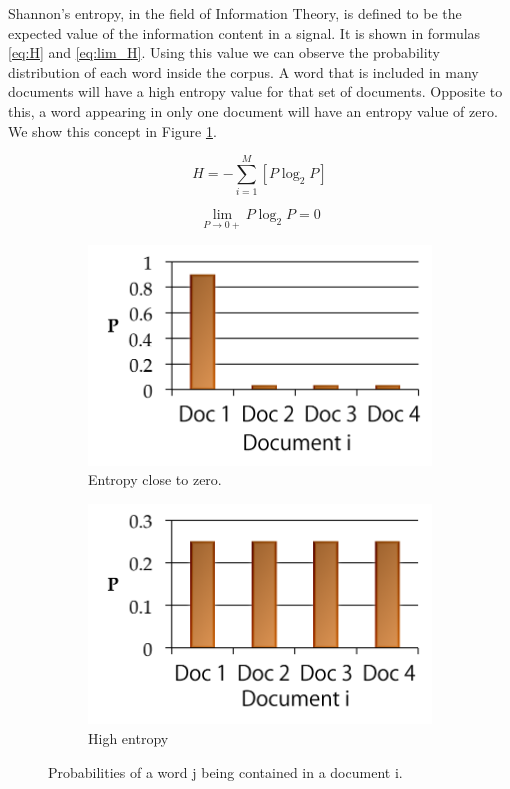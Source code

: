 \documentclass[review]{elsarticle}
\begin{document}
Shannon’s entropy, in the field of Information Theory, is defined to be the expected value of the information content in a signal. It is shown in formulas \ref{eq:H} and \ref{eq:lim_H}. Using this value we can observe the probability distribution of each word inside the corpus. A word that is included in many documents will have a high entropy value for that set of documents. Opposite to this, a word appearing in only one document will have an entropy value of zero. We show this concept in Figure \ref{fig:entropygraphs}.

\begin{equation}\label{eq:H}
H = - \sum_{i=1}^M [P \log_2 P]
\end{equation}

\begin{equation}\label{eq:lim_H}
\lim_{P\to0+} P \log_2 P = 0
\end{equation}

\begin{figure}[bp]
    \centering
    \begin{subfigure}[b]{0.4\linewidth}
        \includegraphics[width=\linewidth]{entropyzero.png}
        \caption{Entropy close to zero.}
    \end{subfigure}
    \begin{subfigure}[b]{0.4\linewidth}
        \includegraphics[width=\linewidth]{entropyhigh.png}
        \caption{High entropy}
    \end{subfigure}
\caption{Probabilities of a word j being contained in a document i.}
\label{fig:entropygraphs}
\end{figure}
\end{document}
